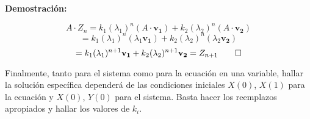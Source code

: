 \textbf{Demostración:}

$$A\cdot Z_n = k_1(\lambda_1)^n(A\cdot \mathbf{v_1})+ k_2(\lambda_2)^n(A\cdot \mathbf{v_2})$$
$$=k_1(\lambda_1)^n(\lambda_1\mathbf{v_1})+ k_2(\lambda_2)^n(\lambda_2 \mathbf{v_2})$$
$$=k_1 (\lambda_1)^{n+1} \mathbf{v_1}+k_2 (\lambda_2)^{n+1} \mathbf{v_2}=Z_{n+1} \qed$$

Finalmente, tanto para el sistema como para la ecuación en una variable, hallar la solución específica dependerá de las condiciones iniciales $X(0)$, $X(1)$ para la ecuación y $X(0)$, $Y(0)$ para el sistema. Basta hacer los reemplazos apropiados y hallar los valores de $k_i$.
